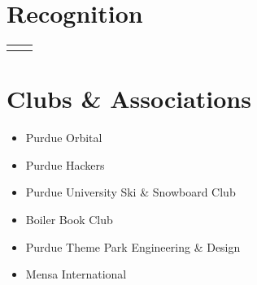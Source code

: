 \documentclass[
	10pt, %
]{FreemanCV}
\begin{document}
\begin{paracol}{2}
	\section{Recognition}




	\begin{supertabular}{r l} %






	\end{supertabular}


	\section{Clubs \& Associations}

	\begin{itemize}
		\item Purdue Orbital
		\item Purdue Hackers
		\item Purdue University Ski \& Snowboard Club
		\item Boiler Book Club
		\item Purdue Theme Park Engineering \& Design
		\item Mensa International
	\end{itemize}


\end{paracol}
\end{document}
